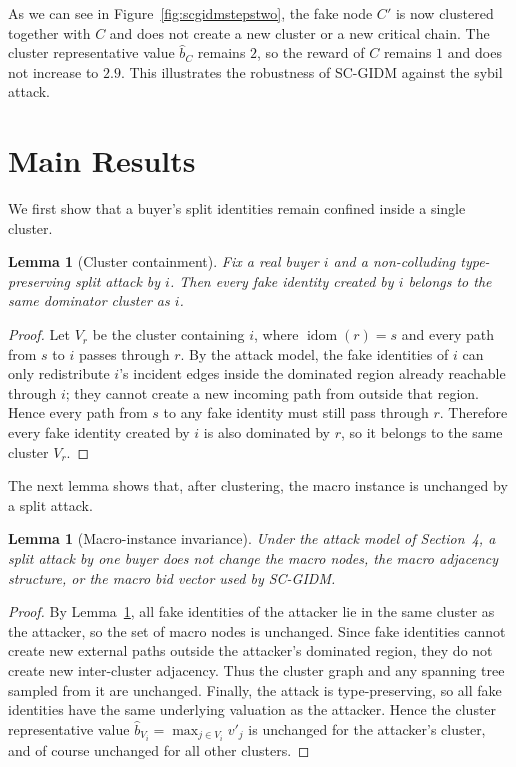 \documentclass[sigconf]{aamas}
\newtheorem{lemma}[theorem]{Lemma}
\theoremstyle{definition}
\theoremstyle{remark}
\newcommand{\idom}{\operatorname{idom}}
\begin{document}
As we can see in Figure~\ref{fig:scgidmstepstwo}, the fake node $C'$ is now clustered together with $C$ and does not create a new cluster or a new critical chain. The cluster representative value $\widehat b_{C}$ remains $2$, so the reward of $C$ remains $1$ and does not increase to $2.9$. This illustrates the robustness of SC-GIDM against the sybil attack.
\section{Main Results}
We first show that a buyer's split identities remain confined inside a single cluster.

\begin{lemma}[Cluster containment]
\label{lem:contain}
Fix a real buyer $i$ and a non-colluding type-preserving split attack by $i$. Then every fake identity created by $i$ belongs to the same dominator cluster as $i$.
\end{lemma}
\begin{proof}
Let $V_r$ be the cluster containing $i$, where $\idom(r)=s$ and every path from $s$ to $i$ passes through $r$. By the attack model, the fake identities of $i$ can only redistribute $i$'s incident edges inside the dominated region already reachable through $i$; they cannot create a new incoming path from outside that region. Hence every path from $s$ to any fake identity must still pass through $r$. Therefore every fake identity created by $i$ is also dominated by $r$, so it belongs to the same cluster $V_r$.
\end{proof}

The next lemma shows that, after clustering, the macro instance is unchanged by a split attack.
\begin{lemma}[Macro-instance invariance]
\label{lem:macro}
Under the attack model of Section~4, a split attack by one buyer does not change the macro nodes, the macro adjacency structure, or the macro bid vector used by SC-GIDM.
\end{lemma}
\begin{proof}
By Lemma~\ref{lem:contain}, all fake identities of the attacker lie in the same cluster as the attacker, so the set of macro nodes is unchanged. Since fake identities cannot create new external paths outside the attacker's dominated region, they do not create new inter-cluster adjacency. Thus the cluster graph and any spanning tree sampled from it are unchanged. Finally, the attack is type-preserving, so all fake identities have the same underlying valuation as the attacker. Hence the cluster representative value $\widehat b_{V_i}=\max_{j\in V_i} v'_j$ is unchanged for the attacker's cluster, and of course unchanged for all other clusters.
\end{proof}
\end{document}
